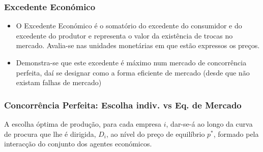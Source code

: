 \begin{frame}
	\frametitle{Excedente Econ\'omico}
	\begin{itemize}
		\setlength\itemsep{1em}
		\item O Excedente Econ\'omico \'e o somat\'orio do excedente do consumidor e do excedente do produtor e representa o valor da exist\^encia de trocas no mercado. Avalia-se nas unidades monet\'arias em que est\~ao expressos os pre\c cos.
		\item Demonstra-se que este excedente \'e m\'aximo num mercado de concorr\^encia perfeita, da\'i se designar como a forma eficiente de mercado (desde que n\~ao existam falhas de mercado)
	\end{itemize}
\end{frame}

\begin{frame}
	\frametitle{Concorr\^encia Perfeita: Escolha indiv. vs Eq. de Mercado}
	A escolha \'optima de produ\c c\~ao, para cada empresa $i$, dar-se-\'a ao longo da curva de procura que lhe \'e dirigida, $D_i$, ao n\'ivel do pre\c co de equil\'ibrio $p^*$, formado pela interac\c c\~ao do conjunto dos agentes econ\'omicos.
	\begin{center}
	\end{center}
	
\end{frame}